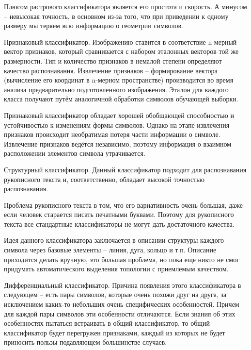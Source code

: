\documentclass[14pt,a4paper]{extreport}
\begin{document}
\hspace{4ex} Плюсом растрового классификатора является его простота и скорость. А минусом – невысокая точность, в основном из-за того, что при приведении к одному размеру мы теряем всю информацию о геометрии символов.\

\hspace{4ex} Признаковый классификатор. Изображению ставится в соответствие n-мерный вектор признаков, который сравнивается с набором эталонных векторов той же размерности. Тип и количество признаков в немалой степени определяют качество распознавания. Извлечение признаков – формирование вектора (вычисление его координат в n-мерном пространстве) производится во время анализа предварительно подготовленного изображения. Эталон для каждого класса получают путём аналогичной обработки символов обучающей выборки.\

\hspace{4ex} Признаковый классификатор обладает хорошей обобщающей способностью и устойчивостью к изменениям формы символов. Однако на этапе извлечения признаков происходит необратимая потеря части информации о символе. Извлечение признаков ведётся независимо, поэтому информация о взаимном расположении элементов символа утрачивается.\

\hspace{4ex} Структурный классификатор. Данный классификатор подходит для распознавания рукописного текста и, соответственно, обладает высокой точностью распознавания.\

\hspace{4ex} Проблема рукописного текста в том, что его вариативность очень большая, даже если человек старается писать печатными буквами. Поэтому для рукописного текста все стандартные классификаторы не могут дать достаточного качества.\ 

\hspace{4ex} Идея данного классификатора заключается в описании структуры каждого символа через базовые элементы – линия, дуга, кольцо и т.п. Описание приходится делать вручную, это большая проблема, но пока еще никто не смог придумать автоматического выделения топологии с приемлемым качеством.

\hspace{4ex} Дифференциальный классификатор. Причина появления этого классификатора в следующем – есть пары символов, которые очень похожи друг на друга, за исключением каких-то небольших очень специфических особенностей. Причем для каждой пары символов эти особенности отличаются. Если знания об этих особенностях пытаться встраивать в общий классификатор, то общий классификатор будет перегружен признаками, каждый из которых не будет приносить пользы подавляющем большинстве случаев.\
\end{document}
